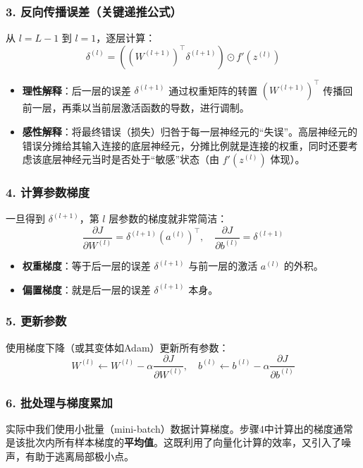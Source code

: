 \subsubsection{3. 反向传播误差（关键递推公式）}
从 $l = L-1$ 到 $l=1$，逐层计算：
\[
\boxed{\delta^{(l)} = \left( (W^{(l+1)})^{\top} \delta^{(l+1)} \right) \odot f'(z^{(l)}) }
\]
\begin{itemize}
    \item \textbf{理性解释}：后一层的误差 $\delta^{(l+1)}$ 通过权重矩阵的转置 $(W^{(l+1)})^{\top}$ 传播回前一层，再乘以当前层激活函数的导数，进行调制。
    \item \textbf{感性解释}：将最终错误（损失）归咎于每一层神经元的“失误”。高层神经元的错误分摊给其输入连接的底层神经元，分摊比例就是连接的权重，同时还要考虑该底层神经元当时是否处于“敏感”状态（由 $f'(z^{(l)})$ 体现）。
\end{itemize}

\subsubsection{4. 计算参数梯度}
一旦得到 $\delta^{(l+1)}$，第 $l$ 层参数的梯度就非常简洁：
\[
\boxed{\frac{\partial J}{\partial W^{(l)}} = \delta^{(l+1)} (a^{(l)})^{\top}}, \quad \boxed{\frac{\partial J}{\partial b^{(l)}} = \delta^{(l+1)}}
\]
\begin{itemize}
    \item \textbf{权重梯度}：等于后一层的误差 $\delta^{(l+1)}$ 与前一层的激活 $a^{(l)}$ 的外积。
    \item \textbf{偏置梯度}：就是后一层的误差 $\delta^{(l+1)}$ 本身。
\end{itemize}

\subsubsection{5. 更新参数}
使用梯度下降（或其变体如Adam）更新所有参数：
\[
W^{(l)} \leftarrow W^{(l)} - \alpha \frac{\partial J}{\partial W^{(l)}}, \quad b^{(l)} \leftarrow b^{(l)} - \alpha \frac{\partial J}{\partial b^{(l)}}
\]

\subsubsection{6. 批处理与梯度累加}
实际中我们使用小批量（mini-batch）数据计算梯度。步骤4中计算出的梯度通常是该批次内所有样本梯度的\textbf{平均值}。这既利用了向量化计算的效率，又引入了噪声，有助于逃离局部极小点。

